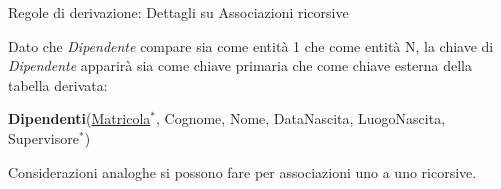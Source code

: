\begin{frame}{Regole di derivazione: Dettagli su Associazioni ricorsive}
\begin{center}
\end{center}
\pause
\vspace{-0.5cm}
Dato che \textit{Dipendente} compare sia come entit\`a 1 che come entit\`a N, la chiave di \textit{Dipendente} apparir\`a sia come chiave primaria che come chiave esterna della tabella derivata:

\pause

\textbf{Dipendenti}(\underline{Matricola}$^*$, Cognome, Nome, DataNascita, LuogoNascita, Supervisore$^*$)

\pause
\vspace{.3cm}
Considerazioni analoghe si possono fare per associazioni uno a uno ricorsive.

\end{frame}